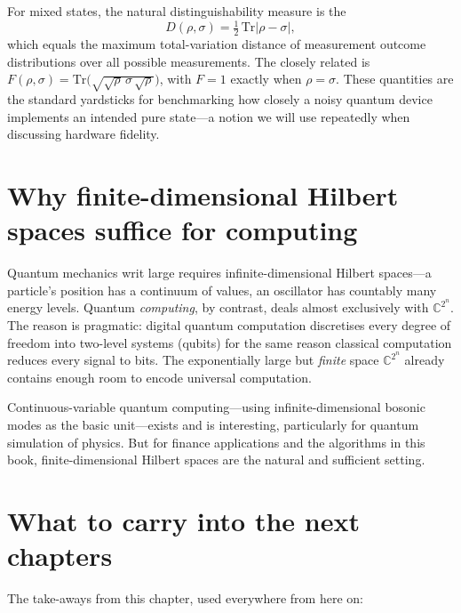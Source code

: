 For mixed states, the natural distinguishability measure is the 
\[
  D(\rho,\sigma) = \tfrac{1}{2}\,\mathrm{Tr}|\rho - \sigma|,
\]
which equals the maximum total-variation distance of measurement outcome distributions over all possible measurements. The closely related  is $F(\rho,\sigma) = \mathrm{Tr}\bigl(\sqrt{\sqrt\rho\,\sigma\,\sqrt\rho}\bigr)$, with $F=1$ exactly when $\rho = \sigma$. These quantities are the standard yardsticks for benchmarking how closely a noisy quantum device implements an intended pure state---a notion we will use repeatedly when discussing hardware fidelity.

\section{Why finite-dimensional Hilbert spaces suffice for computing}

Quantum mechanics writ large requires infinite-dimensional Hilbert spaces---a particle's position has a continuum of values, an oscillator has countably many energy levels. Quantum \emph{computing}, by contrast, deals almost exclusively with $\mathbb{C}^{2^n}$. The reason is pragmatic: digital quantum computation discretises every degree of freedom into two-level systems (qubits) for the same reason classical computation reduces every signal to bits. The exponentially large but \emph{finite} space $\mathbb{C}^{2^n}$ already contains enough room to encode universal computation.

Continuous-variable quantum computing---using infinite-dimensional bosonic modes as the basic unit---exists and is interesting, particularly for quantum simulation of physics. But for finance applications and the algorithms in this book, finite-dimensional Hilbert spaces are the natural and sufficient setting.

\section{What to carry into the next chapters}

The take-aways from this chapter, used everywhere from here on:

